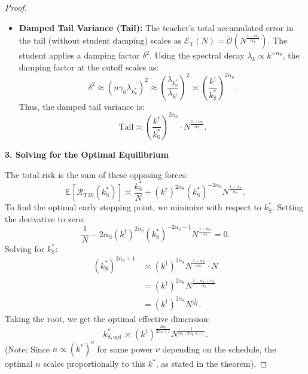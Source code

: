 \documentclass{article}
\theoremstyle{definition}
\theoremstyle{definition}
\theoremstyle{plain}
\theoremstyle{plain}
\theoremstyle{plain}
\theoremstyle{plain}
\theoremstyle{plain}
\newcommand{\Ex}{\mathbb{E}}
\newcommand{\te}{\mathrm{T}}
\newcommand{\st}{\mathrm{S}}
\begin{document}
\begin{proof}
\begin{itemize}
        \item \textbf{Damped Tail Variance (Tail):}
        The teacher's total accumulated error in the tail (without student damping) scales as $\mathcal{E}_\te(N) = \tilde{\mathcal{O}}(N^{\frac{1-\alpha_\te}{\alpha_\te}})$.
        The student applies a damping factor $\delta^2$. Using the spectral decay $\lambda_k \propto k^{-\alpha_\st}$, the damping factor at the cutoff scales as:
        \begin{equation}
             \delta^2 \approx (n \gamma_0 \lambda_{k^*_\st})^2 \approx \left( \frac{\lambda_{k^*_\st}}{\lambda_{k^\dagger}} \right)^2 \asymp \left( \frac{k^\dagger}{k^*_\st} \right)^{2\alpha_\st}.
        \end{equation}
        Thus, the damped tail variance is:
        \begin{equation}
            \text{Tail} \asymp \left( \frac{k^\dagger}{k^*_\st} \right)^{2\alpha_\st} \cdot N^{\frac{1-\alpha_\te}{\alpha_\te}}.
        \end{equation}
    \end{itemize}

    \textbf{3. Solving for the Optimal Equilibrium}
    
    The total risk is the sum of these opposing forces:
    \begin{equation}
        \Ex[\mathcal{R}_{\mathrm{T2S}}(k^*_\st)] \asymp \frac{k^*_\st}{N} + (k^\dagger)^{2\alpha_\st} (k^*_\st)^{-2\alpha_\st} N^{\frac{1-\alpha_\te}{\alpha_\te}}.
    \end{equation}
    To find the optimal early stopping point, we minimize with respect to $k^*_\st$. Setting the derivative to zero:
    \begin{equation}
        \frac{1}{N} - 2\alpha_\st (k^\dagger)^{2\alpha_\st} (k^*_\st)^{-2\alpha_\st-1} N^{\frac{1-\alpha_\te}{\alpha_\te}} = 0.
    \end{equation}
    Solving for $k^*_\st$:
    \begin{equation}
    \begin{aligned}
        (k^*_\st)^{2\alpha_\st+1} &\asymp (k^\dagger)^{2\alpha_\st} N^{\frac{1-\alpha_\te}{\alpha_\te}} \cdot N \\
        &= (k^\dagger)^{2\alpha_\st} N^{\frac{1-\alpha_\te + \alpha_\te}{\alpha_\te}} \\
        &= (k^\dagger)^{2\alpha_\st} N^{\frac{1}{\alpha_\te}}.
    \end{aligned}
    \end{equation}
    Taking the root, we get the optimal effective dimension:
    \begin{equation}
        k^*_{\st, \mathrm{opt}} \asymp (k^\dagger)^{\frac{2\alpha_\st}{2\alpha_\st+1}} N^{\frac{1}{\alpha_\te(2\alpha_\st+1)}}.
    \end{equation}
    (Note: Since $n \propto (k^*)^\nu$ for some power $\nu$ depending on the schedule, the optimal $n$ scales proportionally to this $k^*$, as stated in the theorem).


\end{proof}
\end{document}
